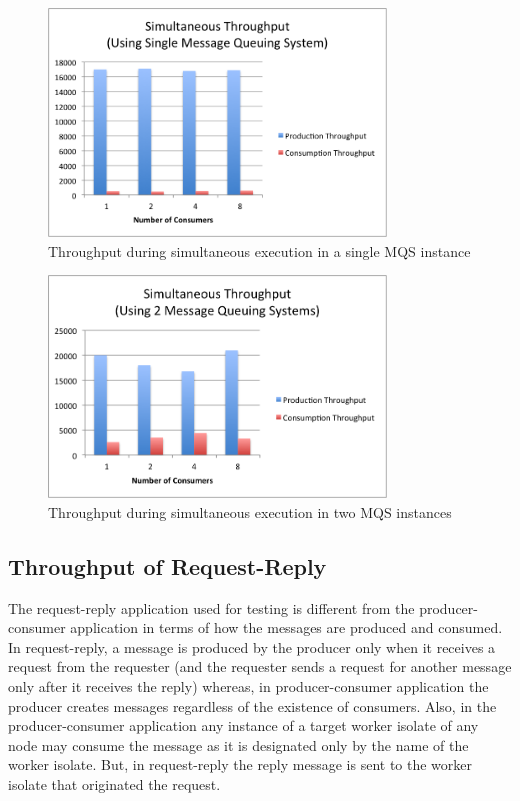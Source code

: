 \begin{figure}[H]
  \centering
  \includegraphics[width=0.8\textwidth]{figures/07simultaneous1}
  \caption[Throughput during simultaneous execution in single MQS]{Throughput during simultaneous execution in a single MQS instance}
  \label{fig:result-simultaneous1}
\end{figure}

\begin{figure}[H]
  \centering
  \includegraphics[width=0.8\textwidth]{figures/08simultaneous2}
  \caption[Throughput during simultaneous execution in two MQS]{Throughput during simultaneous execution in two MQS instances}
  \label{fig:result-simultaneous2}
\end{figure}


\subsection{Throughput of Request-Reply}
\label{subsec:request-reply}
  The request-reply application used for testing is different from the producer-consumer application in terms of how the messages are produced and consumed. In request-reply, a message is produced by the producer only when it receives a request from the requester (and the requester sends a request for another message only after it receives the reply) whereas, in producer-consumer application the producer creates messages regardless of the existence of consumers. Also, in the producer-consumer application any instance of a target worker isolate of any node may consume the message as it is designated only by the name of the worker isolate. But, in request-reply the reply message is sent to the worker isolate that originated the request.

